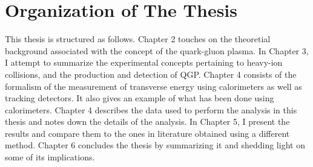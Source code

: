 \section{Organization of The Thesis}
This thesis is structured as follows. Chapter 2 touches on the theoretial background associated with the concept of the quark-gluon plasma. In Chapter 3, I attempt to summarize the experimental concepts pertaining to heavy-ion collisions, and the production and detection of QGP. Chapter 4 consists of the formalism of the measurement of transverse energy using calorimeters as well as tracking detectors. It also gives an example of what has been done using calorimeters. Chapter 4 describes the data used to perform the analysis in this thesis and notes down the details of the analysis. In Chapter 5, I present the results and compare them to the ones in literature obtained using a different method. Chapter 6 concludes the thesis by summarizing it and shedding light on some of its implications.

